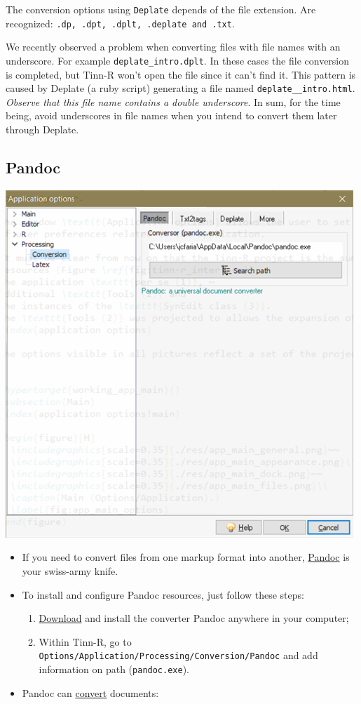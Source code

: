The conversion options using \texttt{Deplate} depends of the file extension.
Are recognized: \texttt{.dp, .dpt, .dplt, .deplate and .txt}.

We recently observed a problem when converting files with file names with an
underscore. For example \texttt{deplate\_intro.dplt}. In these cases the file
conversion is completed, but Tinn-R won't open the file since it can't find it.
This pattern is caused by Deplate (a ruby script) generating a file named
\texttt{deplate\_\_intro.html}. \textit{Observe that this file name contains a
double underscore}. In sum, for the time being, avoid underscores in file
names when you intend to convert them later through Deplate.


\subsection{Pandoc}

\includegraphics[scale=0.50]{./res/app_processing_conversion_pandoc.png}

\begin{itemize}
\item If you need to convert files from one markup format into another, \href{http://johnmacfarlane.net/pandoc/index.html}{Pandoc} is your swiss-army knife.
\item To install and configure Pandoc resources, just follow these steps:
 \begin{enumerate}
 \item \href{http://code.google.com/p/pandoc/downloads/list}{Download} and install the converter Pandoc anywhere in your computer;
 \item Within Tinn-R, go to \texttt{Options/Application/Processing/Conversion/Pandoc} and add information on path (\texttt{pandoc.exe}).

 \end{enumerate}
\item Pandoc can \href{http://johnmacfarlane.net/pandoc/README.html}{convert} documents:
\end{itemize}


